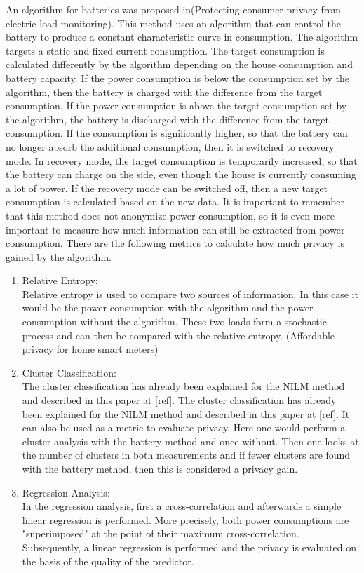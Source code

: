 An algorithm for batteries was proposed in(Protecting consumer privacy
from electric load monitoring). This method uses an algorithm that can control the battery to produce a constant characteristic curve in consumption.  The algorithm targets a static and fixed current consumption. The target consumption is calculated differently by the algorithm depending on the house consumption and battery capacity. If the power consumption is below the consumption set by the algorithm, then the battery is charged with the difference from the target consumption. If the power consumption is above the target consumption set by the algorithm, the battery is discharged with the difference from the target consumption. If the consumption is significantly higher, so that the battery can no longer absorb the additional consumption, then it is switched to recovery mode. In recovery mode, the target consumption is temporarily increased, so that the battery can charge on the side, even though the house is currently consuming a lot of power. If the recovery mode can be switched off, then a new target consumption is calculated based on the new data. It is important to remember that this method does not anonymize power consumption, so it is even more important to measure how much information can still be extracted from power consumption. There are the following metrics to calculate how much privacy is gained by the algorithm.
\begin{enumerate}
\item Relative Entropy:\\
Relative entropy is used to compare two sources of information. In this case it would be the power consumption with the algorithm and the power consumption without the algorithm. These two loads form a stochastic process and can then be compared with the relative entropy. (Affordable privacy for home
smart meters)
\item Cluster Classification:\\
The cluster classification has already been explained for the NILM method and described in this paper at [ref].  The cluster classification has already been explained for the NILM method and described in this paper at [ref]. It can also be used as a metric to evaluate privacy. Here one would perform a cluster analysis with the battery method and once without. Then one looks at the number of clusters in both measurements and if fewer clusters are found with the battery method, then this is considered a privacy gain.
\item Regression Analysis:\\
In the regression analysis, first a cross-correlation and afterwards a simple linear regression is performed. More precisely, both power consumptions are "superimposed" at the point of their maximum cross-correlation. Subsequently, a linear regression is performed and the privacy is evaluated on the basis of the quality of the predictor.
\end{enumerate}

